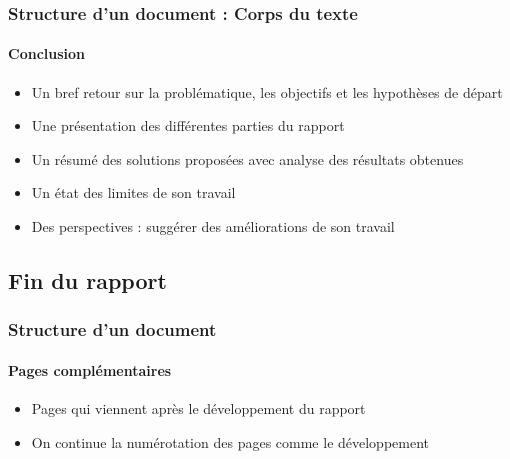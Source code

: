 \documentclass[xcolor=table]{beamer}
\begin{document}
\begin{frame}
\frametitle{Structure d'un document : Corps du texte}
\framesubtitle{Conclusion}

\begin{minipage}{0.60\textwidth}
	\begin{itemize}
		\item Un bref retour sur la problématique, les objectifs et les hypothèses de départ
		\item Une présentation des différentes parties du rapport
		\item Un résumé des solutions proposées avec analyse des résultats obtenues
		\item Un état des limites de son travail 
		\item Des perspectives : suggérer des améliorations de son travail
	\end{itemize}
\end{minipage}
\begin{minipage}{0.38\textwidth}
\end{minipage}

\end{frame}

\subsection{Fin du rapport}

\begin{frame}
\frametitle{Structure d'un document}
\framesubtitle{Pages complémentaires}

\begin{itemize}
	\item Pages qui viennent après le développement du rapport
	\item On continue la numérotation des pages comme le développement
\end{itemize}

\end{frame}
\end{document}
